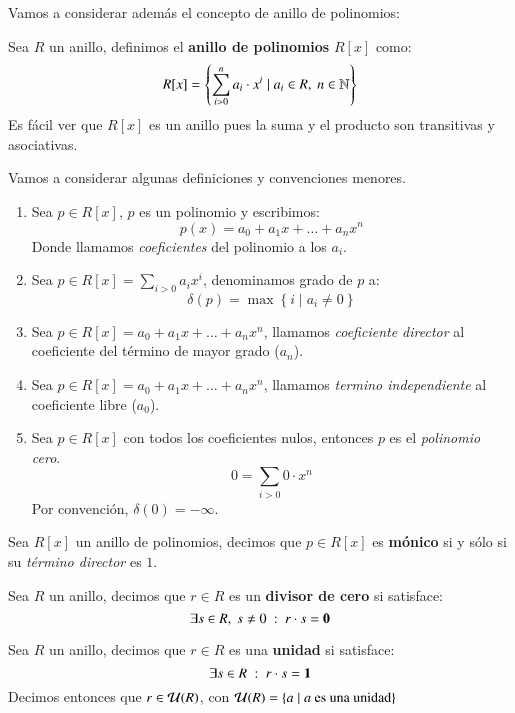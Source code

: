 Vamos a considerar además el concepto de anillo de polinomios:
\begin{dfn}
    Sea $R$ un anillo, definimos el \textbf{anillo de polinomios} $R[x]$ como:
    $$
        R[x] = \left\{ \sum_{i > 0}^{n} a_i \cdot x^i \mid a_i \in R,\ n \in \mathbb{N} \right\}
    $$
    Es fácil ver que $R[x]$ es un anillo pues la suma y el producto son transitivas y asociativas.
\end{dfn}
\begin{obs}
    Vamos a considerar algunas definiciones y convenciones menores.\\
    \begin{enumerate}
        \item Sea $p \in R[x]$, $p$ es un polinomio y escribimos:
        $$
            p(x) = a_0 + a_1 x + \ldots + a_n x^n
        $$
        Donde llamamos \textit{coeficientes} del polinomio a los $a_i$.
        \item Sea $p \in R[x] = \sum_{i > 0} a_i x^i$, denominamos grado de $p$ a:
        $$
            \delta(p) = \max \left\{ i \mid a_i \neq 0 \right\}
        $$
        \item Sea $p \in R[x] = a_0 + a_1 x + \ldots + a_n x^n$, llamamos \textit{coeficiente director} al coeficiente del término de mayor grado ($a_n$).
        \item  Sea $p \in R[x] = a_0 + a_1 x + \ldots + a_n x^n$, llamamos \textit{termino independiente} al coeficiente libre ($a_0$).
        \item Sea $p \in R[x]$ con todos los coeficientes nulos, entonces $p$ es el \textit{polinomio cero}.
        $$
            0 = \sum_{i > 0} 0 \cdot x^n
        $$
        Por convención, $\delta(0) = -\infty$.
    \end{enumerate}
\end{obs}

\begin{dfn}
    Sea $R[x]$ un anillo de polinomios, decimos que $p \in R[x]$ es \textbf{mónico} si y sólo si su \textit{término director} es $1$.
\end{dfn}

\begin{dfn}
    Sea $R$ un anillo, decimos que $r \in R$ es un \textbf{divisor de cero} si satisface:
    $$
        \exists s \in R,\ s\neq 0\ :\ r\cdot s = \mathbf{0}
    $$
\end{dfn}
\begin{dfn}
    Sea $R$ un anillo, decimos que $r \in R$ es una \textbf{unidad} si satisface:
    $$
        \exists s \in R\ :\ r\cdot s = \mathbf{1}
    $$
    Decimos entonces que $r \in \mathcal{U}(R)$, con $\mathcal{U}(R) = \left\{a \mid a\text{ es una unidad}\right\}$
\end{dfn}

